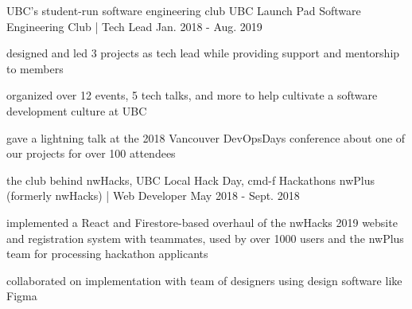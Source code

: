 \begin{cventries}

  \cventry
    {UBC's student-run software engineering club} %
    {UBC Launch Pad Software Engineering Club | Tech Lead} %
    {} %
    {Jan. 2018 - Aug. 2019} %
    {
      \begin{cvitems} %
        \item {designed and led 3 projects as tech lead while providing support and mentorship to members}
        \item {organized over 12 events, 5 tech talks, and more to help cultivate a software development culture at UBC}
        \item {gave a lightning talk at the 2018 Vancouver DevOpsDays conference about one of our projects for over 100 attendees}
      \end{cvitems}
    }

  \cventry
    {the club behind nwHacks, UBC Local Hack Day, cmd-f Hackathons} %
    {nwPlus (formerly nwHacks) | Web Developer} %
    {} %
    {May 2018 - Sept. 2018} %
    {
      \begin{cvitems} %
        \item {implemented a React and Firestore-based overhaul of the nwHacks 2019 website and registration system with teammates, used by over 1000 users and the nwPlus team for processing hackathon applicants}
        \item {collaborated on implementation with team of designers using design software like Figma}
      \end{cvitems}
    }

\end{cventries}
